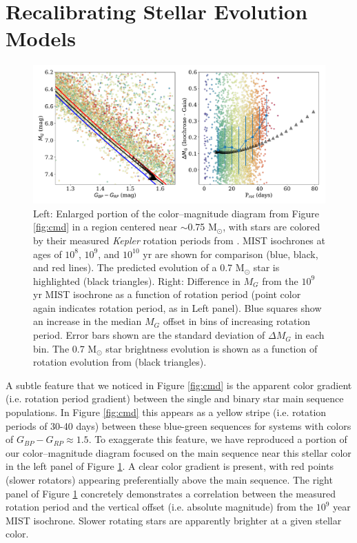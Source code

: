 \documentclass[preprint2]{aastex62}
\newcommand{\Kepler}{\textsl{Kepler}\xspace}
\begin{document}
\vspace{1in}

\section{Recalibrating Stellar Evolution Models}


\begin{figure}
\centering
\includegraphics[width=6in]{../figures/cmd_zoom}
\caption{
Left: Enlarged portion of the color--magnitude diagram from Figure \ref{fig:cmd} in a region centered near $\sim$0.75 M$_\odot$, with stars are colored by their measured \Kepler rotation periods from \citet{mcquillan2014}.
MIST isochrones at ages of $10^8$, $10^9$, and $10^{10}$ yr are shown for comparison (blue, black, and red lines). The predicted evolution of a 0.7 M$_\odot$ star is highlighted (black triangles). %
Right: Difference in $M_G$ from the $10^9$ yr MIST isochrone as a function of rotation period (point color again indicates rotation period, as in Left panel). Blue squares show an increase in the median $M_G$ offset in bins of increasing rotation period. Error bars shown are the standard deviation of $\Delta M_G$ in each bin. The 0.7 M$_\odot$ star brightness evolution is shown as a function of rotation evolution from \citet{meibom2009} (black triangles).
}
\label{fig:cmd_zoom}
\end{figure}

A subtle feature that we noticed in Figure \ref{fig:cmd} is the apparent color gradient (i.e. rotation period gradient) between the single and binary star main sequence populations. In Figure \ref{fig:cmd} this appears as a yellow stripe (i.e. rotation periods of 30-40 days) between these blue-green sequences for systems with colors of $G_{BP} - G_{RP} \approx 1.5$. To exaggerate this feature, we have reproduced a portion of our color--magnitude diagram focused on the main sequence near this stellar color in the left panel of Figure \ref{fig:cmd_zoom}. A clear color gradient is present, with red points (slower rotators) appearing preferentially above the main sequence.
The right panel of Figure \ref{fig:cmd_zoom} concretely demonstrates a correlation between the measured rotation period and the vertical offset (i.e. absolute magnitude) from the $10^9$ year MIST isochrone. Slower rotating stars are apparently brighter at a given stellar color.
\end{document}
